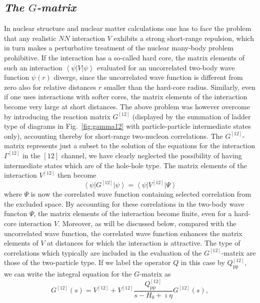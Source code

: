 \documentclass[twoside,12pt]{article}
\newcommand{\bra}[1]{\left\langle #1 \right|}
\newcommand{\ket}[1]{\left| #1 \right\rangle}
\begin{document}
\subsection{\it The $G$-matrix}

In nuclear structure and nuclear matter calculations one has to
face the problem that any realistic $NN$ interaction $V$
exhibits a strong short-range repulsion, which in turn makes
a perturbative treatment of the nuclear many-body problem
prohibitive. If the interaction has a so-called hard core,
the matrix elements of such an interaction $\bra{\psi}V\ket{\psi}$
evaluated
for an uncorrelated two-body wave function $\psi (r)$ diverge,
since the uncorrelated wave function is different from zero also for
relative distances $r$ smaller than the hard-core radius. Similarly,
even if one uses interactions with softer cores, the matrix elements of the
interaction become very large at short distances.
The above problem was however overcome by
introducing the reaction matrix $G^{[12]}$ (displayed by  the summation
of ladder type of diagrams in Fig.\ \ref{fig:gamma12}
with particle-particle intermediate states only),
accounting thereby for short-range two-nucleon correlations.
The $G^{[12]}$-matrix represents just a subset to the solution
of the equations for the interaction $\Gamma^{[12]}$ in the $[12]$ channel,
we have clearly neglected the possibility of having intermediate states
which are of the hole-hole type.
The matrix elements of the
interaction $V^{[12]}$ then become
\begin{equation}
\bra{\psi}G^{[12]}\ket{\psi} =\bra{\psi}V^{[12]}\ket{\Psi}
\end{equation}
where $\Psi$ is now the correlated wave function
containing selected correlation from the excluded space.
By accounting for these
correlations in the two-body wave functon $\Psi$, the matrix elements of
the interaction become finite, even for a hard-core interaction $V$. Moreover,
as will be discussed below, compared with the uncorrelated
wave function, the correlated wave function enhances the
matrix elements of $V$ at distances for which the interaction is
attractive.
The type of correlations which typically are included in the evaluation
of the $G^{[12]}$-matrix are those of the two-particle type.
If we label the operator $Q$ in this case by $Q^{[12]}_{\mathrm{pp}}$, we can write
the integral equation for the $G$-matrix as
\begin{equation}
   G^{[12]}(s)=V^{[12]}+V^{[12]}\frac{Q^{[12]}_{\mathrm{pp}}}
           {s -H_0+\imath \eta}G^{[12]}(s),
   \label{eq:g1}
\end{equation}
\end{document}
